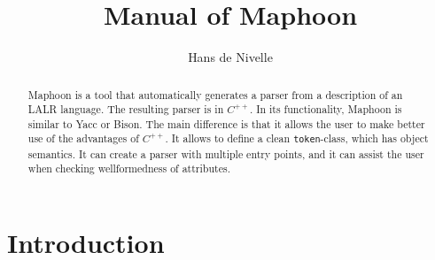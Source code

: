 \documentclass{article}
\title{Manual of Maphoon}
\author{Hans de Nivelle}
\begin{document}
\maketitle
\begin{abstract}
   \noindent
   Maphoon is a tool that automatically generates a 
   parser from a description of an LALR
   language. The resulting parser is in $ C^{++}. $ 
   In its functionality, Maphoon is similar to Yacc or Bison.
   The main difference is that it allows the user to make better
   use of the advantages of $ C^{++}. $ It allows to define a clean
   \verb+token+-class, which has object semantics.
   It can create a parser with multiple entry points, and 
   it can assist the user when checking wellformedness of attributes.
\end{abstract}

\section{Introduction}
\end{document}
